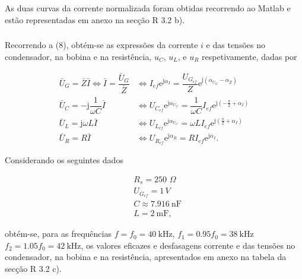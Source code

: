 \documentclass[a4paper, titlepage, portuguese]{article}
\newcommand{\eq}{\Leftrightarrow} %
\begin{document}
	As duas curvas da corrente normalizada foram obtidas recorrendo ao Matlab e estão representadas em anexo na secção R 3.2 b). \\ 
	

	\subsubsection{}
	
		Recorrendo a (8), obtém-se as expressões da corrente $i$ e das tensões no condensador, na bobina e na resistência, $u_C$, $u_L$, e $u_R$ respetivamente, dadas por
		
		\begin{align*}
			\bar{U}_G = \bar{Z} \bar{I} \eq \bar{I} = \dfrac{\bar{U}_G}{\bar{Z}} & \eq I_{ef} \mathrm{e}^{\mathrm{j} \alpha_I} = \dfrac{U_{G_{ef}}}{Z} \mathrm{e}^{\mathrm{j}\left(\alpha_{U_G} - \alpha_{Z}\right)}\\
			\bar{U}_C = -\mathrm{j} \dfrac{1}{\omega C} \bar{I} &\eq U_{C_{ef}} \mathrm{e}^{\mathrm{j} \alpha_{U_C}}= \dfrac{1}{\omega C}I_{ef} \mathrm{e}^{\mathrm{j} \left(-\frac{\pi}{2}+\alpha_I\right)} \\
			\bar{U}_L = \mathrm{j}\omega L \bar{I} &\eq U_{L_{ef}} \mathrm{e}^{\mathrm{j} \alpha_{U_C}}=\omega LI_{ef} \mathrm{e}^{\mathrm{j} \left(\frac{\pi}{2}+\alpha_I\right)}  \\
			\bar{U}_R = R \bar{I} &\eq {U}_{R_{ef}}\mathrm{e}^{\mathrm{j} \alpha_R}= R I_{ef} \mathrm{e}^{\mathrm{j} \alpha_I}.
		\end{align*}

		Considerando os seguintes dados
	
		\begin{align*}
			&R _ { s } = 250\hspace{4pt}\Omega \\
			&U_{G_{ef}} = 1\hspace{2pt}V\\
			&C \approx \SI{7.916}{\nano\farad}\\
			&L = \SI{2}{\milli\farad}, 
		\end{align*}

		 obtém-se, para as frequências $f = f_0 = \SI{40}{\kilo\hertz}$, $f_1 = 0.95f_0= \SI{38}{\kilo\hertz}$ $f_2 = 1.05f_0 = \SI{42}{\kilo\hertz}$, os valores eficazes e desfasagens corrente e das tensões no condensador, na bobina e na resistência, apresentados em anexo na tabela da secção R 3.2 c).
	
	\newpage
	\subsubsection{}
	
\end{document}
